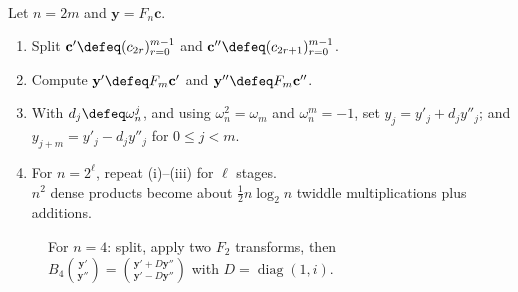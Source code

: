 \begin{method} \label{meth:radix-two-fft-split} \\
Let $n=2m$ and $\mathbf{y}=F_n\mathbf{c}$.
\begin{enumerate}[label=(\roman*)]
\setlength{\itemsep}{0pt}
\item Split $\mathbf{c}'\defeq(c_{2r})_{r=0}^{m-1}$ and $\mathbf{c}''\defeq(c_{2r+1})_{r=0}^{m-1}$.
\item Compute $\mathbf{y}'\defeq F_m\mathbf{c}'$ and $\mathbf{y}''\defeq F_m\mathbf{c}''$.
\item With $d_j\defeq\omega_n^j$, and using $\omega_n^2=\omega_m$ and $\omega_n^m=-1$, set $y_j=y'_j+d_jy''_j$; and $y_{j+m}=y'_j-d_jy''_j$ for $0\leq j<m$.
\item For $n=2^\ell$, repeat (i)--(iii) for $\ell$ stages.\\
$n^2$ dense products become about $\frac12 n\log_2 n$ twiddle multiplications plus additions.
\end{enumerate}
\end{method}

\begin{figure}[H]
  \centering
  
  \caption{For $n=4$: split, apply two $F_2$ transforms, then $B_4\binom{\mathbf{y}'}{\mathbf{y}''}=\binom{\mathbf{y}'+D\mathbf{y}''}{\mathbf{y}'-D\mathbf{y}''}$ with $D=\operatorname{diag}(1,i)$.}
  \label{fig:fft-butterfly-n4}
\end{figure}

